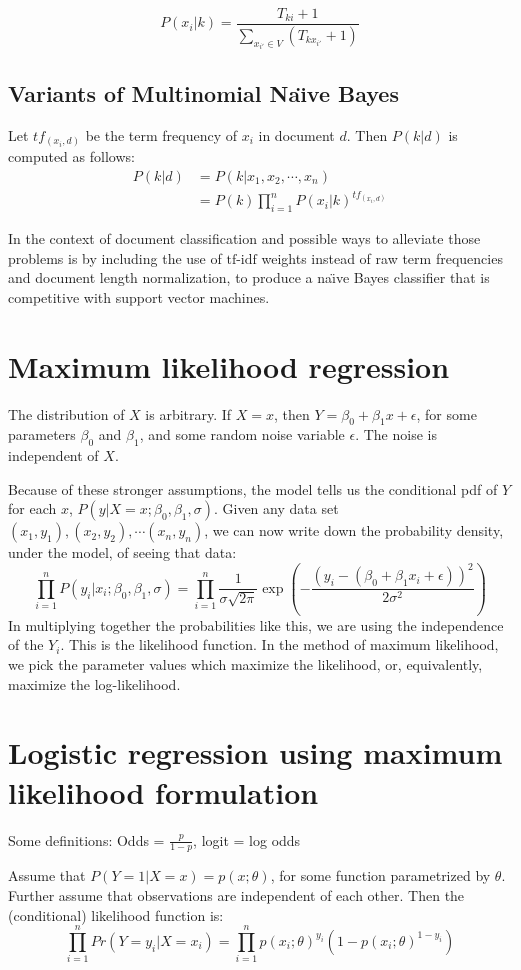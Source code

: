 \documentclass{article}
\begin{document}
\[P(x_i|k) = \frac{T_{ki}+1}{\sum_{x_{i'} \in V} (T_{kx_{i'}}+1)}\]



\subsection{Variants of Multinomial Na\"{\i}ve Bayes}
Let $tf_{(x_i,d)}$ be the term frequency of $x_i$ in document $d$. Then $P(k|d)$ is computed as follows:
\begin{align*} 
P(k|d) &= P(k|x_1,x_2,\cdots,x_n) \\
 &= P(k)\prod_{i=1}^{n} P(x_i|k)^{tf_{(x_i,d)}}
\end{align*}


In the context of document classification and possible ways to alleviate those problems is by including the use of $\mbox{tf-idf}$ weights instead of raw term frequencies and document length normalization, to produce a na\"{\i}ve Bayes classifier that is competitive with support vector machines.

\section{Maximum likelihood regression}
The distribution of $X$ is arbitrary. If $X=x$, then $Y=\beta_0+\beta_1 x+\epsilon$, for some parameters $\beta_0$ and $\beta_1$, and some random noise variable $\epsilon$. The noise is independent of $X$.

Because of these stronger assumptions, the model tells us the conditional pdf of $Y$ for each $x$, $P(y|X=x;\beta_0,\beta_1,\sigma)$. Given any data set $(x_1,y_1),(x_2,y_2),\cdots (x_n,y_n)$, we can now write down the probability density, under the model, of seeing that data:
\[
\prod_{i=1}^n P(y_i|x_i;\beta_0,\beta_1,\sigma) = \prod_{i=1}^n \frac{1}{\sigma\sqrt{2\pi}}  \exp \left( -\frac{(y_i-(\beta_0+\beta_1 x_i+\epsilon))^2}{2\sigma^2} \right)
\]
In multiplying together the probabilities like this, we are using the independence of the $Y_i$. This is the likelihood function. In the method of maximum likelihood, we pick the parameter values which  maximize  the  likelihood,  or,  equivalently,  maximize  the  log-likelihood.

\section{Logistic regression using maximum likelihood formulation}
Some definitions:
Odds = $\frac{p}{1-p}$, logit = log odds

Assume that $P(Y=1|X=x)=p(x;\theta)$, for some function parametrized by $\theta$. Further assume that observations are independent of each other. Then the (conditional) likelihood function is:
\[
\prod_{i=1}^{n} Pr(Y=y_i|X=x_i) = \prod_{i=1}^{n} p(x_i;\theta)^{y_i} (1-p(x_i;\theta)^{1-y_i}) 
\]
\end{document}

